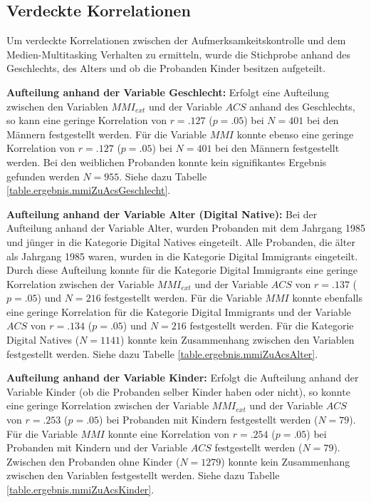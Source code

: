 \subsection{Verdeckte Korrelationen}
Um verdeckte Korrelationen zwischen der Aufmerksamkeitskontrolle und dem Medien-Multitasking Verhalten zu ermitteln, wurde die Stichprobe anhand des Geschlechts, des Alters und ob die Probanden Kinder besitzen aufgeteilt.
\par
\textbf{Aufteilung anhand der Variable Geschlecht:} Erfolgt eine Aufteilung zwischen den Variablen $MMI_{ext}$ und der Variable $ACS$ anhand des Geschlechts, so kann eine geringe Korrelation von $r=.127$ ($p=.05$) bei $N=401$ bei den Männern festgestellt werden. Für die Variable $MMI$ konnte ebenso eine geringe Korrelation von $r=.127$ ($p=.05$) bei $N=401$ bei den Männern festgestellt werden. Bei den weiblichen Probanden konnte kein signifikantes Ergebnis gefunden werden $N=955$. Siehe dazu Tabelle \ref{table.ergebnis.mmiZuAcsGeschlecht}.
\par
\textbf{Aufteilung anhand der Variable Alter (Digital Native):} Bei der Aufteilung anhand der Variable Alter, wurden Probanden mit dem Jahrgang 1985 und jünger in die Kategorie Digital Natives eingeteilt. Alle Probanden, die älter als Jahrgang 1985 waren, wurden in die Kategorie Digital Immigrants eingeteilt. Durch diese Aufteilung konnte für die Kategorie Digital Immigrants eine geringe Korrelation zwischen der Variable $MMI_{ext}$ und der Variable $ACS$ von $r=.137$ ($p=.05$) und $N=216$ festgestellt werden. Für die Variable $MMI$ konnte ebenfalls eine geringe Korrelation für die Kategorie Digital Immigrants und der Variable $ACS$ von $r=.134$ ($p=.05$) und $N=216$ festgestellt werden. Für die Kategorie Digital Natives ($N=1141$) konnte kein Zusammenhang zwischen den Variablen festgestellt werden. Siehe dazu Tabelle \ref{table.ergebnis.mmiZuAcsAlter}.
\par
\textbf{Aufteilung anhand der Variable Kinder:} Erfolgt die Aufteilung anhand der Variable Kinder (ob die Probanden selber Kinder haben oder nicht), so konnte eine geringe Korrelation zwischen der Variable $MMI_{ext}$ und der Variable $ACS$ von $r=.253$ ($p=.05$) bei Probanden mit Kindern festgestellt werden ($N=79$). Für die Variable $MMI$ konnte eine Korrelation von $r=.254$ ($p=.05$) bei Probanden mit Kindern und der Variable $ACS$ festgestellt werden ($N=79$). Zwischen den Probanden ohne Kinder ($N=1279$) konnte kein Zusammenhang zwischen den Variablen festgestellt werden. Siehe dazu Tabelle \ref{table.ergebnis.mmiZuAcsKinder}.

